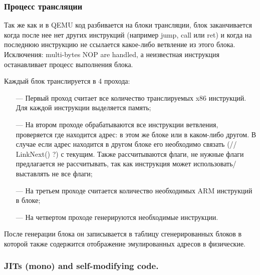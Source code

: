 \subsubsection{Процесс трансляции}

Так же как и в QEMU код разбивается на блоки трансляции, блок заканчивается когда после нее нет других инструкций (например jump, call или ret) и когда на последнюю инструкцию не ссылается какое-либо ветвление из этого блока. Исключения: multi-bytes NOP are handled, а неизвестная инструкция останавливает процесс выполнения блока.

Каждый блок транслируется в 4 прохода:
\begin{itemize}[leftmargin=1.6\parindent]
	\item[---] Первый проход считает все количество транслируемых x86 инструкций. Для каждой инструкции выделяется память;
	\item[---] На втором проходе обрабатываются все инструкции ветвления, проверяется где находится адрес: в этом же блоке или в каком-либо другом. В случае если адрес находится в другом блоке его необходимо связать (// LinkNext() ?) с текущим. Также рассчитываются флаги, не нужные флаги предлагается не рассчитывать, так как инструкция может использовать/выставлять не все флаги;
	\item[---] На третьем проходе считается количество необходимых ARM инструкций в блоке;
	\item[---] На четвертом проходе генерируются необходимые инструкции.
\end{itemize}

После генерации блока он записывается в таблицу сгенерированных блоков в которой также содержится отображение эмулированных адресов в физические. \cite{box64_wide}

\subsubsection{JITs (mono) and self-modifying code.}

